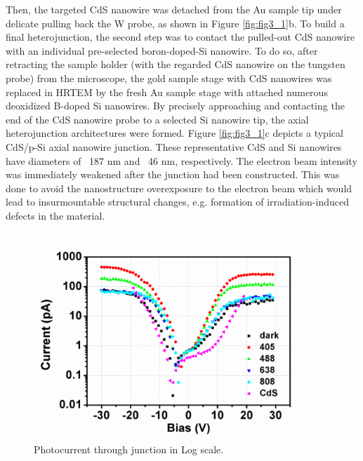 Then, the targeted CdS nanowire was detached from the Au sample tip under delicate pulling back the W probe, as shown in Figure \ref{fig:fig3_1}b. To build a final heterojunction, the second step was to contact the pulled-out CdS nanowire with an individual pre-selected boron-doped-Si nanowire. To do so, after retracting the sample holder (with the regarded CdS nanowire on the tungsten probe) from the microscope, the gold sample stage with CdS nanowires was replaced in HRTEM by the fresh Au sample stage with attached numerous deoxidized B-doped Si nanowires. By precisely approaching and contacting the end of the CdS nanowire probe to a selected Si nanowire tip, the axial heterojunction architectures were formed. Figure \ref{fig:fig3_1}c depicts a typical CdS/p-Si axial nanowire junction. These representative CdS and Si nanowires have diameters of ~187 nm and ~46 nm, respectively. The electron beam intensity was immediately weakened after the junction had been constructed. This was done to avoid the nanostructure overexposure to the electron beam which would lead to insurmountable structural changes, e.g. formation of irradiation-induced defects in the material.

\begin{figure}  
\includegraphics[width=\textwidth]{figures/figure3_4}
\caption[Photocurrent in Log scale.]{Photocurrent through junction in Log scale.
\label{fig:fig3_4}}
\end{figure}

